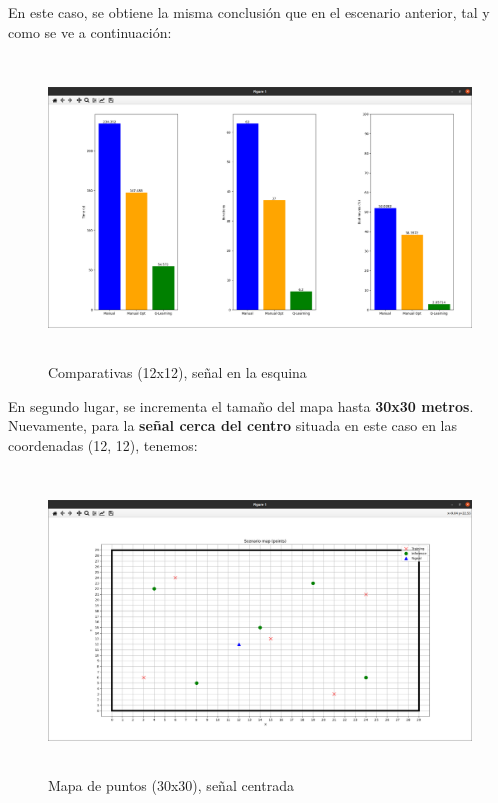 En este caso, se obtiene la misma conclusión que en el escenario anterior, tal y como se ve a continuación:\\

\begin{figure} [H]
    \begin{center}
    \includegraphics[height=8cm]{imagenes/cap4/20_comp_esq_12.png}
    \end{center}
    \caption[Comparativas (12x12), señal en la esquina]{Comparativas (12x12), señal en la esquina}
    \label{fig:comp_esq_12}
\end{figure}

En segundo lugar, se incrementa el tamaño del mapa hasta \textbf{30x30 metros}.\\

Nuevamente, para la \textbf{señal cerca del centro} situada en este caso en las coordenadas (12, 12), tenemos:

\begin{figure} [H]
    \begin{center}
    \includegraphics[height=8cm]{imagenes/cap4/21_mapa_p_centro_30.png}
    \end{center}
    \caption[Mapa de puntos (30x30), señal centrada]{Mapa de puntos (30x30), señal centrada}
    \label{fig:map_p_center_30}
\end{figure}

